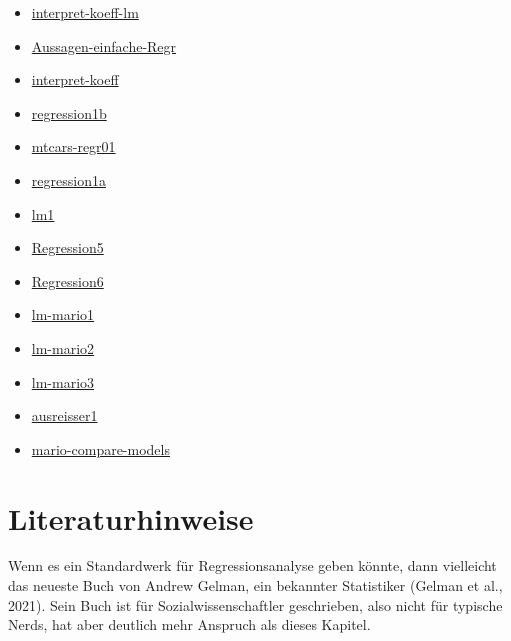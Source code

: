 \documentclass[
  a4paper,
]{scrbook}
\providecommand{\tightlist}{%
  \setlength{\itemsep}{0pt}\setlength{\parskip}{0pt}}\usepackage{longtable,booktabs,array}
\theoremstyle{definition}
\theoremstyle{definition}
\theoremstyle{definition}
\theoremstyle{remark}
\begin{document}
\begin{itemize}
\tightlist
\item
  \href{https://datenwerk.netlify.app/posts/interpret-koeff-lm/interpret-koeff-lm.html}{interpret-koeff-lm}
\item
  \href{https://datenwerk.netlify.app/posts/aussagen-einfache-regr/aussagen-einfache-regr}{Aussagen-einfache-Regr}
\item
  \href{https://datenwerk.netlify.app/posts/interpret-koeff/interpret-koeff.html}{interpret-koeff}
\item
  \href{https://datenwerk.netlify.app/posts/regression1b/regression1b.html}{regression1b}
\item
  \href{https://datenwerk.netlify.app/posts/mtcars-regr01/mtcars-regr01.html}{mtcars-regr01}
\item
  \href{https://datenwerk.netlify.app/posts/regression1a/regression1a.html}{regression1a}
\item
  \href{https://datenwerk.netlify.app/posts/lm1/lm1.html}{lm1}
\item
  \href{https://datenwerk.netlify.app/posts/regression5/regression5}{Regression5}
\item
  \href{https://datenwerk.netlify.app/posts/regression6/regression6}{Regression6}
\item
  \href{https://datenwerk.netlify.app/posts/lm-mario1/lm-mario1.html}{lm-mario1}
\item
  \href{https://datenwerk.netlify.app/posts/lm-mario2/lm-mario2.html}{lm-mario2}
\item
  \href{https://datenwerk.netlify.app/posts/lm-mario3/lm-mario3.html}{lm-mario3}
\item
  \href{https://datenwerk.netlify.app/posts/ausreisser1/ausreisser1.html}{ausreisser1}
\item
  \href{https://datenwerk.netlify.app/posts/mario-compare-models/}{mario-compare-models}
\end{itemize}

\section{Literaturhinweise}\label{literaturhinweise-7}

Wenn es ein Standardwerk für Regressionsanalyse geben könnte, dann
vielleicht das neueste Buch von Andrew Gelman, ein bekannter Statistiker
(Gelman et al., 2021). Sein Buch ist für Sozialwissenschaftler
geschrieben, also nicht für typische Nerds, hat aber deutlich mehr
Anspruch als dieses Kapitel.
\end{document}
